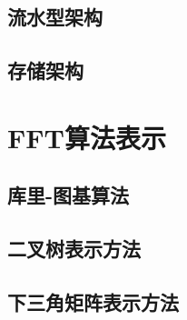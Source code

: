 \subsection[\hspace{-2pt}流水型架构]{{ \hspace{-8pt}}流水型架构}



\subsection[\hspace{-2pt}存储架构]{{ \hspace{-8pt}}存储架构}



\section[\hspace{-2pt}FFT算法表示]{{\hspace{-8pt}FFT算法表示}}\label{section 2-2}
\subsection[\hspace{-2pt}库里-图基算法]{{ \hspace{-8pt}}库里-图基算法}
\subsection[\hspace{-2pt}二叉树表示方法]{{ \hspace{-8pt}}二叉树表示方法}
\subsection[\hspace{-2pt}下三角矩阵表示方法]{{ \hspace{-8pt}}下三角矩阵表示方法} 

